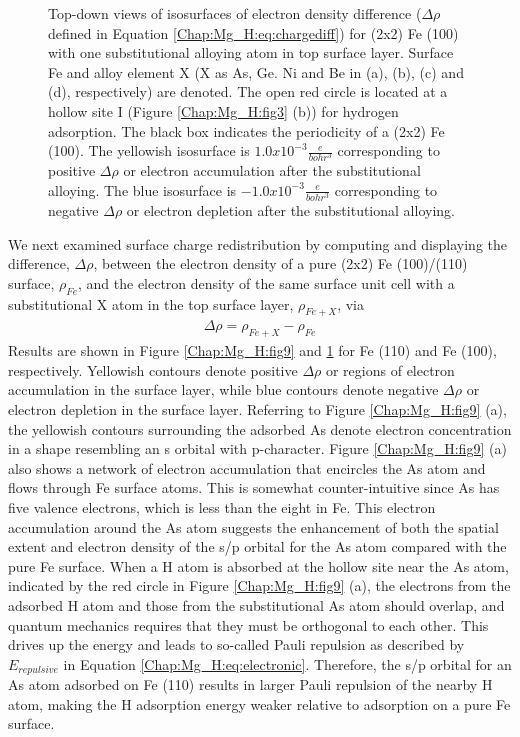 \begin{figure}[!ht]
\caption[Top-down views of isosurfaces of electron density difference for (2x2) Fe (100) with one substitutional alloying atom in top surface layer]{Top-down views of isosurfaces of electron density difference ($\Delta \rho$ defined in Equation \ref{Chap:Mg_H:eq:chargediff}) for (2x2) Fe (100) with one substitutional alloying atom in top surface layer. Surface Fe and alloy element X (X as As, Ge. Ni and Be in (a), (b), (c) and (d), respectively) are denoted. The open red circle is located at a hollow site I (Figure \ref{Chap:Mg_H:fig3} (b)) for hydrogen adsorption. The black box indicates the periodicity of a (2x2) Fe (100). The yellowish isosurface is $1.0x10^{-3}\frac{e}{bohr^3}$ corresponding to positive $\Delta \rho$ or electron accumulation after the substitutional alloying. The blue isosurface is $-1.0x10^{-3}\frac{e}{bohr^3}$ corresponding to negative $\Delta \rho$ or electron depletion after the substitutional alloying.}
  \label{Chap:Mg_H:fig10}
\end{figure}
\endgroup

We next examined surface charge redistribution by computing and displaying the difference, $\Delta \rho$, between the electron density of a pure (2x2) Fe (100)/(110) surface, $\rho_{Fe}$, and the electron density of the same surface unit cell with a substitutional X atom in the top surface layer, $\rho_{Fe+X}$, via
\begin{align}
\Delta \rho = \rho_{Fe+ X} - \rho_{Fe}
\label{Chap:Mg_H:eq:chargediff}
\end{align}
Results are shown in Figure \ref{Chap:Mg_H:fig9} and \ref{Chap:Mg_H:fig10} for Fe (110) and Fe (100), respectively. Yellowish contours denote positive $\Delta \rho$ or regions of electron accumulation in the surface layer, while blue contours denote negative $\Delta \rho$ or electron depletion in the surface layer. Referring to Figure \ref{Chap:Mg_H:fig9} (a), the yellowish contours surrounding the adsorbed As denote electron concentration in a shape resembling an s orbital with p-character. Figure \ref{Chap:Mg_H:fig9} (a) also shows a network of electron accumulation that encircles the As atom and flows through Fe surface atoms. This is somewhat counter-intuitive since As has five valence electrons, which is less than the eight in Fe. This electron accumulation around the As atom suggests the enhancement of both the spatial extent and electron density of the s/p orbital for the As atom compared with the pure Fe surface. When a H atom is absorbed at the hollow site near the As atom, indicated by the red circle in Figure \ref{Chap:Mg_H:fig9} (a), the electrons from the adsorbed H atom and those from the substitutional As atom should overlap, and quantum mechanics requires that they must be orthogonal to each other. This drives up the energy and leads to so-called Pauli repulsion as described by $E_{repulsive}$ in Equation \ref{Chap:Mg_H:eq:electronic}. Therefore, the s/p orbital for an As atom adsorbed on Fe (110) results in larger Pauli repulsion of the nearby H atom, making the H adsorption energy weaker relative to adsorption on a pure Fe surface. 


